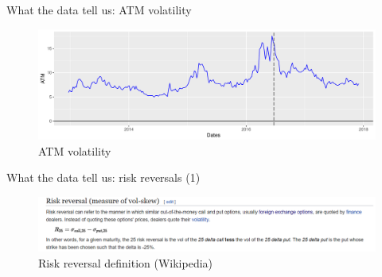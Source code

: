 \begin{frame}[fragile]{What the data tell us: ATM volatility}

\begin{Shaded}
\begin{Highlighting}[]
\StringTok{ }\OperatorTok{+}\StringTok{ }\NormalTok{(}\NormalTok{) }\OperatorTok{+}\StringTok{ }
\StringTok{        }\NormalTok{(}\NormalTok{)}
\StringTok{ }\OperatorTok{+}\StringTok{ }\NormalTok{(}\NormalTok{(}\NormalTok{((}\NormalTok{))),}
                     \NormalTok{)}
\end{Highlighting}
\end{Shaded}

\begin{figure}
\includegraphics[width=1\linewidth]{2018_02_07_IMF_FXCourse_files/figure-beamer/unnamed-chunk-11-1} \caption{ATM volatility}\label{fig:unnamed-chunk-11}
\end{figure}

\end{frame}

\begin{frame}{What the data tell us: risk reversals (1)}

\begin{figure}
\includegraphics[width=1\linewidth]{images/figRRDefinition} \caption{Risk reversal definition (Wikipedia)}\label{fig:unnamed-chunk-12}
\end{figure}

\end{frame}

